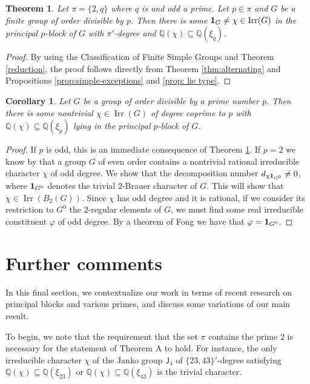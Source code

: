 \documentclass[a4paper,12pt,leqno]{amsart}
\def\irr#1{{\Irr}(#1)}
\def\sbs{\subseteq}
\newcommand{\6}{^}
\newcommand{\Irr}{\operatorname{Irr}}
\newtheorem{cor}[subsection]{Corollary}
\newtheorem{thm}[subsection]{Theorem}
\theoremstyle{definition}
\theoremstyle{definition}
\theoremstyle{definition}
\theoremstyle{definition}
\theoremstyle{definition}
\def\Q{\mathbb Q}
\begin{document}
\begin{thm}\label{thm:ThmA}   Let $\pi=\{ 2, q \}$ where $q$ is and odd a prime. Let $p \in \pi$ and $G$ be a finite group of order divisible by $p$. 
Then there is some ${\bf 1}_G\neq \chi \in \irr {G}$ in the principal $p$-block of $G$ with $\pi'$-degree and $\Q(\chi)\sbs \Q(\xi_q)$.
\end{thm}

\begin{proof} By using the Classification of Finite Simple Groups and Theorem \ref{reduction}, the proof follows directly from Theorem \ref{thm:alternating} and Propositions \ref{prop:simple-exceptions} and \ref{prop: lie type}.
\end{proof}


  
\begin{cor} Let $G$ be a group of order divisible by a prime number $p$. Then there is some nontrivial $\chi \in \irr G$ of degree coprime to $p$ with $\Q(\chi)\sbs \Q(\xi_p)$ lying in the principal $p$-block of $G$.
 \end{cor}
\begin{proof}
If $p$ is odd, this is an immediate consequence of Theorem \ref{thm:ThmA}.
 If $p=2$ we know by \cite[Theorem B]{NT08} that a group $G$ of even order contains a nontrivial rational irreducible character $\chi$ of odd degree. 
 We show that the decomposition number $d_{\chi {\bf 1}_{G^0}}\neq 0$, where ${\bf 1}_{G^0}$ denotes the trivial $2$-Brauer character of $G$. This will show that $\chi \in \irr{B_2(G)}$.
 Since $\chi$ has odd degree and it is rational, if we consider its restriction to $G^0$ the $2$-regular elements of $G$, we must find some real irreducible constituent $\varphi$ of odd degree.
 By a theorem of Fong \cite[Theorem 2.30]{Nav98} we have that $\varphi={\bf 1}_{G^0}$.
\end{proof}


\section{Further comments} \label{sec:comments}

In this final section, we contextualize our work in terms of recent research on principal blocks and various primes, and discuss some variations of our main result.

To begin, we note that the requirement that the set $\pi$ contains the prime $2$ is necessary for the statement of Theorem A to hold. For instance, the only irreducible character $\chi$ of the Janko group $\mathsf{J}_4$ of $\{23, 43\}'$-degree satisfying $\mathbb{Q}(\chi) \subseteq \mathbb{Q}(\xi_{23})$ or $\mathbb{Q}(\chi) \subseteq \mathbb{Q}(\xi_{43})$ is the trivial character. 
\end{document}

